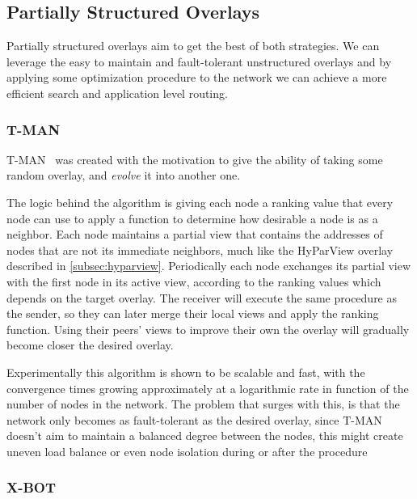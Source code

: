 \subsection{Partially Structured Overlays}\label{sub:partially_structured_overlays}

Partially structured overlays aim to get the best of both strategies. We can 
leverage the easy to maintain and fault-tolerant unstructured overlays and
by applying some optimization procedure to the network we can achieve a more
efficient search and application level routing.

\subsubsection{T-MAN}\label{subsec:t-man}

T-MAN~\cite{tman} was created with the motivation to give
the ability of taking some random overlay, and \textit{evolve} it into another one.

The logic behind the algorithm is giving each node a ranking value that every node can
use to apply a function to determine how desirable a node is as a neighbor.
Each node maintains a partial view that contains the addresses of nodes that are not its
immediate neighbors, much like the HyParView overlay described in \ref{subsec:hyparview}.
Periodically each node exchanges its partial view with the first node in its active view,
according to the ranking
values which depends on the target overlay. The receiver will execute the same procedure
as the sender, so they can later merge their local views and apply the ranking function.
Using their peers' views to improve their own the overlay will gradually become closer
the desired overlay.

Experimentally this algorithm is shown to be scalable and fast, with the convergence
times growing approximately at a logarithmic rate in function of the number of nodes in
the network. The problem that surges with this, is that the network only becomes as 
fault-tolerant as the desired overlay, since T-MAN doesn't aim to maintain a balanced degree
between the nodes, this might create uneven load balance or even node isolation during
or after the procedure

\subsubsection{X-BOT}\label{subsec:x-bot}

